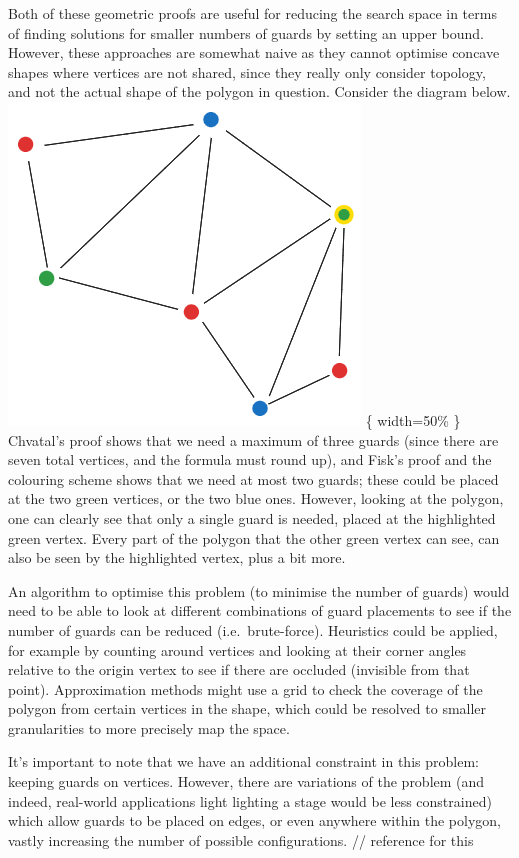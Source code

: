 \documentclass[
]{article}
\begin{document}
Both of these geometric proofs are useful for reducing the search space
in terms of finding solutions for smaller numbers of guards by setting
an upper bound. However, these approaches are somewhat naive as they
cannot optimise concave shapes where vertices are not shared, since they
really only consider topology, and not the actual shape of the polygon
in question. Consider the diagram below.
\includegraphics{diagrams/Complicated Gallery.png} \{ width=50\% \}
Chvatal's proof shows that we need a maximum of three guards (since
there are seven total vertices, and the formula must round up), and
Fisk's proof and the colouring scheme shows that we need at most two
guards; these could be placed at the two green vertices, or the two blue
ones. However, looking at the polygon, one can clearly see that only a
single guard is needed, placed at the highlighted green vertex. Every
part of the polygon that the other green vertex can see, can also be
seen by the highlighted vertex, plus a bit more.

An algorithm to optimise this problem (to minimise the number of guards)
would need to be able to look at different combinations of guard
placements to see if the number of guards can be reduced
(i.e.~brute-force). Heuristics could be applied, for example by counting
around vertices and looking at their corner angles relative to the
origin vertex to see if there are occluded (invisible from that point).
Approximation methods might use a grid to check the coverage of the
polygon from certain vertices in the shape, which could be resolved to
smaller granularities to more precisely map the space.

It's important to note that we have an additional constraint in this
problem: keeping guards on vertices. However, there are variations of
the problem (and indeed, real-world applications light lighting a stage
would be less constrained) which allow guards to be placed on edges, or
even anywhere within the polygon, vastly increasing the number of
possible configurations. // reference for this
\end{document}
